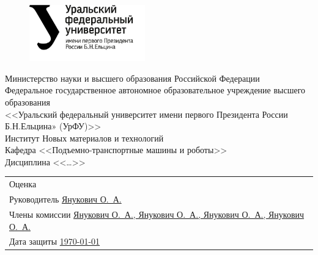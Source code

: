 \thispagestyle{empty}

\def\authorName{Гусев Андрей Александрович}
\def\groupNumber{НМТ-402320}
\def\teacherName{Янукович О.~А.}
\def\topicName{\ldots}
\def\disciplineName{\ldots}

\begin{figure}
    \vspace{1mm}
    \includegraphics[width = 5cm]{logo.jpg}
\end{figure}

\begin{spacing}{1}
    \noindent \scriptsize{\textsf{Министерство науки и высшего образования Российской Федерации \\
            Федеральное государственное автономное образовательное учреждение высшего образования \\
            <<Уральский федеральный университет имени первого Президента России Б.Н.Ельцина» (УрФУ)>> \\
            Институт Новых материалов и технологий \\
            Кафедра <<Подъемно-транспортные машины и роботы>> \\
            Дисциплина <<\disciplineName>> \\ }
    }
\end{spacing}

\vfill

\begin{flushright}
    \begin{tabular}{p{7cm}}
        Оценка \uline{\hfill}                           \\
        Руководитель \uline{\hfill \teacherName \hfill} \\
        Члены комиссии \uline{
            Янукович О.~А.,
            Янукович О.~А.,
            Янукович О.~А.,
            Янукович О.~А.
            \hfill
        }                                               \\
        Дата защиты \uline{\hfill \today \hfill}        \\
    \end{tabular}
\end{flushright}

